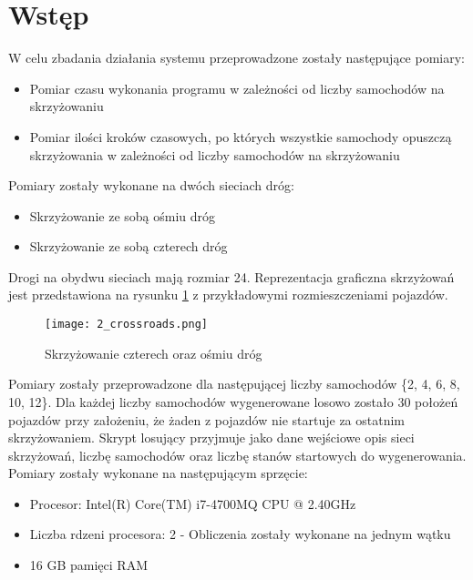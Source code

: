  \label{chap:outcomes}

\section{Wstęp}

W celu zbadania działania systemu przeprowadzone zostały następujące pomiary:
\begin{itemize}
\item Pomiar czasu wykonania programu w zależności od liczby samochodów na skrzyżowaniu 
\item Pomiar ilości kroków czasowych, po których wszystkie samochody opuszczą skrzyżowania w zależności od liczby samochodów na skrzyżowaniu
\end{itemize}

Pomiary zostały wykonane na dwóch sieciach dróg:
\begin{itemize}
\item Skrzyżowanie ze sobą ośmiu dróg
\item Skrzyżowanie ze sobą czterech dróg
\end{itemize}

Drogi na obydwu sieciach mają rozmiar 24. Reprezentacja graficzna skrzyżowań jest przedstawiona na rysunku \ref{both-crossroads} z przykładowymi rozmieszczeniami pojazdów.
\begin{figure}[H]
    \texttt{[image: 2\_crossroads.png]}
  \caption{Skrzyżowanie czterech oraz ośmiu dróg}
  \label{both-crossroads}
\end{figure}

Pomiary zostały przeprowadzone dla następującej liczby samochodów \{2, 4, 6, 8, 10, 12\}. Dla każdej liczby samochodów wygenerowane losowo zostało 30 położeń pojazdów przy założeniu, że żaden z pojazdów nie startuje za ostatnim skrzyżowaniem. Skrypt losujący przyjmuje jako dane wejściowe opis sieci skrzyżowań, liczbę samochodów oraz liczbę stanów startowych do wygenerowania.
\newline
\newline
Pomiary zostały wykonane na następującym sprzęcie:
\begin{itemize}
\item Procesor: Intel(R) Core(TM) i7-4700MQ CPU @ 2.40GHz
\item Liczba rdzeni procesora: 2 - Obliczenia zostały wykonane na jednym wątku
\item 16 GB pamięci RAM
\end{itemize}

